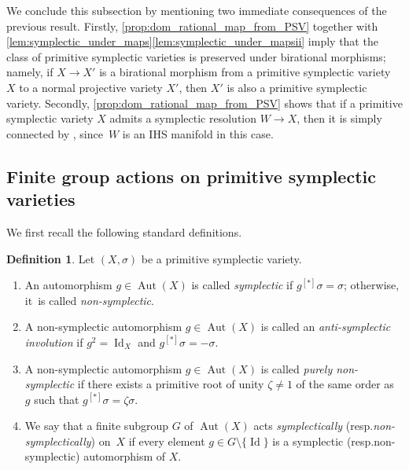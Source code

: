\documentclass[10pt]{amsart}
\newcommand{\resp}{resp.}
\theoremstyle{plain}
\theoremstyle{definition}
\newtheorem{dfn}[thm]{Definition}
\DeclareMathOperator{\Id}{Id}
\DeclareMathOperator{\Aut}{Aut}
\begin{document}
We conclude this subsection by mentioning two immediate consequences of the previous result. Firstly, \autoref{prop:dom_rational_map_from_PSV} together with \autoref{lem:symplectic_under_maps}\eqref{lem:symplectic_under_mapsii} imply that the class of primitive symplectic varieties is preserved under birational morphisms; namely, if $X \to X'$ is a birational morphism from a primitive symplectic variety~$X$ to a normal projective variety $X'$, then $X'$ is also a primitive symplectic variety. Secondly, \autoref{prop:dom_rational_map_from_PSV} shows that if a primitive symplectic variety $X$ admits a symplectic resolution $W \to X$, then it is simply connected by \cite[Th.\,1.1]{Tak03}, since~$W$ is an IHS manifold in this case.

\subsection{Finite group actions on primitive symplectic varieties}
\label{subsection:finite_group_actions}

We first recall the following standard definitions.

\begin{dfn}
Let $(X,\sigma)$ be a primitive symplectic variety.
\begin{enumerate}
\item
An automorphism $g \in \Aut(X)$ is called \emph{symplectic} if $g^{[*]} \sigma = \sigma$; otherwise, it~is called \emph{non-symplectic}.

\item
A non-symplectic automorphism $g \in \Aut(X)$ is called an \emph{anti-symplectic involution} if $g^2 = \Id_X$ and $g^{[*]} \sigma = - \sigma$.

\item
A non-symplectic automorphism $g \in \Aut(X)$ is called \emph{purely non-symplectic} if there exists a primitive root of unity $\zeta \neq 1$ of the same order as $g$ such that $g^{[*]} \sigma = \zeta \sigma$.

\item
We say that a finite subgroup $G$ of $\Aut(X)$ acts \emph{symplectically} (\resp \emph{non-symplec\-tically}) on~$X$ if every element $g \in G \setminus \{\Id\}$ is a symplectic (\resp non-symplectic) automorphism of $X$.
\end{enumerate}
\end{dfn}
\end{document}
